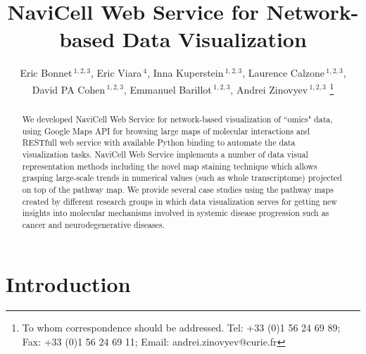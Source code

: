 \documentclass[a4,center,fleqn]{NAR}
\begin{document}
\title{NaviCell Web Service for Network-based Data Visualization}


\author{%
Eric Bonnet\,$^{1,2,3}$,
Eric Viara\,$^{4}$,
Inna Kuperstein\,$^{1,2,3}$,
Laurence Calzone\,$^{1,2,3}$,
David PA Cohen\,$^{1,2,3}$,
Emmanuel Barillot\,$^{1,2,3}$,
Andrei Zinovyev\,$^{1,2,3}$%
\footnote{To whom correspondence should be addressed.
Tel: +33 (0)1 56 24 69 89; Fax: +33 (0)1 56 24 69 11; Email: andrei.zinovyev@curie.fr}}

\address{%
$^{1}$Institut Curie, 26 rue d'Ulm, 75248 Paris, France,
$^{2}$INSERM U900, 75248 Paris, France,
$^{3}$Mines ParisTech, 77300 Fontainebleau, France,
$^{4}$Sysra, 91330 Yerres, France.
}




\maketitle

\begin{abstract}
We developed NaviCell Web Service for network-based visualization of ``omics" data, using Google Maps API 
for browsing large maps of molecular interactions and RESTfull web service with available Python binding 
to automate the data visualization tasks. NaviCell Web Service implements a number of data visual representation
methods including the novel map staining technique which allows grasping large-scale trends in 
numerical values (such as whole transcriptome) projected on top of the pathway map. We provide several
case studies using the pathway maps created by different research groups in which data visualization
serves for getting new insights into molecular mechanisms involved in systemic disease progression such as cancer
and neurodegenerative diseases.

\end{abstract}


\section{Introduction}
\end{document}
